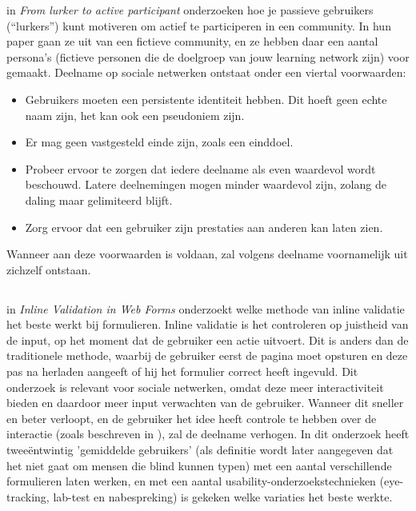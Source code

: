 \documentclass[a4paper, 10pt, pdftex]{report}
\begin{document}
    in \emph{From lurker to active participant} onderzoeken \citeauthor{Sloep2009} hoe je passieve gebruikers (``lurkers'') kunt motiveren om actief te participeren in een community. In hun paper gaan ze uit van een fictieve community, en ze hebben daar een aantal persona's (fictieve personen die de doelgroep van jouw learning network zijn) voor gemaakt. Deelname op sociale netwerken ontstaat onder een viertal voorwaarden:
    \begin{itemize}
    \item Gebruikers moeten een persistente identiteit hebben. Dit hoeft geen echte naam zijn, het kan ook een pseudoniem zijn.
    \item Er mag geen vastgesteld einde zijn, zoals een einddoel.
    \item Probeer ervoor te zorgen dat iedere deelname als even waardevol wordt beschouwd. Latere deelnemingen mogen minder waardevol zijn, zolang de daling maar gelimiteerd blijft.
    \item Zorg ervoor dat een gebruiker zijn prestaties aan anderen kan laten zien.
  \end{itemize}
    Wanneer aan deze voorwaarden is voldaan, zal volgens \citeauthor{Sloep2009} deelname voornamelijk uit zichzelf ontstaan.

  \subsection{\cite{Wroblewski2009}}
    in \emph{Inline Validation in Web Forms} onderzoekt \citeauthor{Wroblewski2009} welke methode van inline validatie het beste werkt bij formulieren. Inline validatie is het controleren op juistheid van de input, op het moment dat de gebruiker een actie uitvoert. Dit is anders dan de traditionele methode, waarbij de gebruiker eerst de pagina moet opsturen en deze pas na herladen aangeeft of hij het formulier correct heeft ingevuld. Dit onderzoek is relevant voor sociale netwerken, omdat deze meer interactiviteit bieden en daardoor meer input verwachten van de gebruiker. Wanneer dit sneller en beter verloopt, en de gebruiker het idee heeft controle te hebben over de interactie (zoals beschreven in \cite{Beenen2004}), zal de deelname verhogen. In dit onderzoek heeft \citeauthor{Wroblewski2009} twee\"{e}ntwintig 'gemiddelde gebruikers'  (als definitie wordt later aangegeven dat het niet gaat om mensen die blind kunnen typen) met een aantal verschillende formulieren laten werken, en met een aantal usability-onderzoekstechnieken (eye-tracking, lab-test en nabespreking) is gekeken welke variaties het beste werkte.
\end{document}

